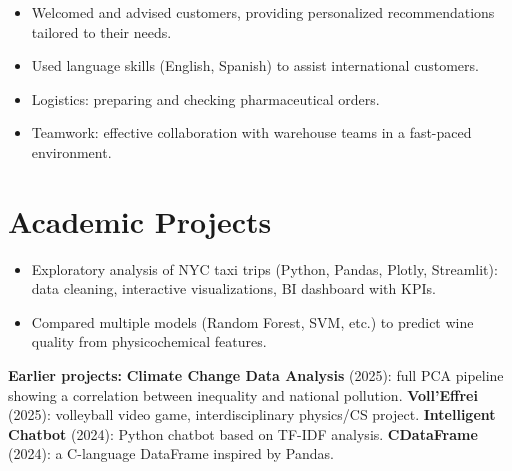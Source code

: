 \documentclass[9.5pt]{article}
\begin{document}
\begin{minipage}[t]{0.645\textwidth}
\vspace{1pt}
\begin{itemize}\small
  \item Welcomed and advised customers, providing personalized recommendations tailored to their needs.
  \item Used language skills (English, Spanish) to assist international customers.
\end{itemize}

\vspace{1pt}
\begin{itemize}\small
  \item Logistics: preparing and checking pharmaceutical orders.
  \item Teamwork: effective collaboration with warehouse teams in a fast-paced environment.
\end{itemize}

\section*{\large\bfseries\color{accent}Academic Projects}
\vspace{-2pt}
\begin{itemize}\small
  \item Exploratory analysis of NYC taxi trips (Python, Pandas, Plotly, Streamlit): data cleaning, interactive visualizations, BI dashboard with KPIs.
\end{itemize}

\vspace{1pt}
\begin{itemize}\small
  \item Compared multiple models (Random Forest, SVM, etc.) to predict wine quality from physicochemical features.
\end{itemize}

\vspace{2pt}
\noindent\small
\textbf{Earlier projects:}
\textbf{Climate Change Data Analysis} (2025): full PCA pipeline showing a correlation between inequality and national pollution.
\textbf{Voll'Effrei} (2025): volleyball video game, interdisciplinary physics/CS project.
\textbf{Intelligent Chatbot} (2024): Python chatbot based on TF-IDF analysis.
\textbf{CDataFrame} (2024): a C-language DataFrame inspired by Pandas.

\end{minipage}%
\end{document}
